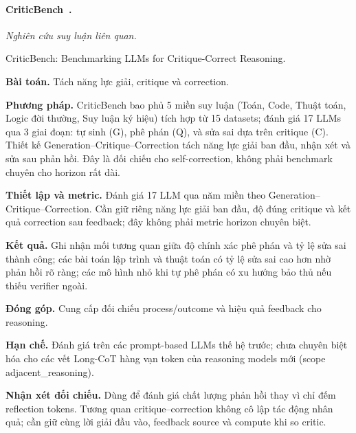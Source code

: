 \begin{samepage}
\paragraph{CriticBench~\cite{rra4_criticbench}.}
\emph{Nghiên cứu suy luận liên quan.}\par
{\raggedright\noindent\small CriticBench: Benchmarking LLMs for Critique-Correct Reasoning.\par}
\noindent\textbf{Bài toán.} Tách năng lực giải, critique và correction.\par
\end{samepage}
\noindent\textbf{Phương pháp.} CriticBench bao phủ 5 miền suy luận (Toán, Code, Thuật toán, Logic đời thường, Suy luận ký hiệu) tích hợp từ 15 datasets; đánh giá 17 LLMs qua 3 giai đoạn: tự sinh (G), phê phán (Q), và sửa sai dựa trên critique (C). Thiết kế Generation–Critique–Correction tách năng lực giải ban đầu, nhận xét và sửa sau phản hồi. Đây là đối chiếu cho self-correction, không phải benchmark chuyên cho horizon rất dài.\par
\noindent\textbf{Thiết lập và metric.} Đánh giá 17 LLM qua năm miền theo Generation–Critique–Correction. Cần giữ riêng năng lực giải ban đầu, độ đúng critique và kết quả correction sau feedback; đây không phải metric horizon chuyên biệt.\par
\noindent\textbf{Kết quả.} Ghi nhận mối tương quan giữa độ chính xác phê phán và tỷ lệ sửa sai thành công; các bài toán lập trình và thuật toán có tỷ lệ sửa sai cao hơn nhờ phản hồi rõ ràng; các mô hình nhỏ khi tự phê phán có xu hướng bảo thủ nếu thiếu verifier ngoài.\par
\noindent\textbf{Đóng góp.} Cung cấp đối chiếu process/outcome và hiệu quả feedback cho reasoning.\par
\noindent\textbf{Hạn chế.} Đánh giá trên các prompt-based LLMs thế hệ trước; chưa chuyên biệt hóa cho các vết Long-CoT hàng vạn token của reasoning models mới (scope adjacent\_reasoning).\par
\begin{samepage}
\noindent\textbf{Nhận xét đối chiếu.} Dùng để đánh giá chất lượng phản hồi thay vì chỉ đếm reflection tokens. Tương quan critique–correction không cô lập tác động nhân quả; cần giữ cùng lời giải đầu vào, feedback source và compute khi so critic.\par
{}
\end{samepage}

